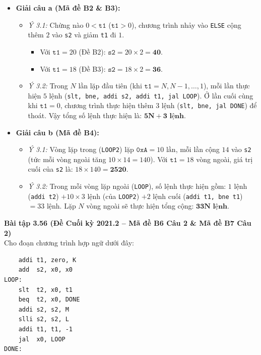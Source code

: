 \begin{itemize}
    \item \textbf{Giải câu a (Mã đề B2 \& B3):}
    \begin{itemize}
        \item \textit{Ý 3.1:} Chừng nào $0 < \texttt{t1}$ ($\texttt{t1} > 0$), chương trình nhảy vào \texttt{ELSE} cộng thêm $2$ vào \texttt{s2} và giảm \texttt{t1} đi $1$.
        \begin{itemize}
            \item Với $\texttt{t1} = 20$ (Đề B2): $\texttt{s2} = 20 \times 2 = \mathbf{40}$.
            \item Với $\texttt{t1} = 18$ (Đề B3): $\texttt{s2} = 18 \times 2 = \mathbf{36}$.
        \end{itemize}
        \item \textit{Ý 3.2:} Trong $N$ lần lặp đầu tiên (khi $\texttt{t1} = N, N-1, \dots, 1$), mỗi lần thực hiện $5$ lệnh (\texttt{slt, bne, addi s2, addi t1, jal LOOP}). Ở lần cuối cùng khi $\texttt{t1} = 0$, chương trình thực hiện thêm $3$ lệnh (\texttt{slt, bne, jal DONE}) để thoát. Vậy tổng số lệnh thực hiện là: $\mathbf{5N + 3\text{ lệnh}}$.
    \end{itemize}
    \item \textbf{Giải câu b (Mã đề B4):}
    \begin{itemize}
        \item \textit{Ý 3.1:} Vòng lặp trong (\texttt{LOOP2}) lặp $\texttt{0xA} = 10\text{ lần}$, mỗi lần cộng $14$ vào \texttt{s2} (tức mỗi vòng ngoài tăng $10 \times 14 = 140$). Với $\texttt{t1} = 18$ vòng ngoài, giá trị cuối của \texttt{s2} là: $18 \times 140 = \mathbf{2520}$.
        \item \textit{Ý 3.2:} Trong mỗi vòng lặp ngoài (\texttt{LOOP}), số lệnh thực hiện gồm: $1$ lệnh (\texttt{addi t2}) $+ 10 \times 3\text{ lệnh}$ (của \texttt{LOOP2}) $+ 2\text{ lệnh}$ cuối (\texttt{addi t1, bne t1}) $= 33\text{ lệnh}$. Lặp $N$ vòng ngoài sẽ thực hiện tổng cộng: $\mathbf{33N\text{ lệnh}}$.
    \end{itemize}
\end{itemize}

\textbf{Bài tập 3.56 (Đề Cuối kỳ 2021.2 -- Mã đề B6 Câu 2 \& Mã đề B7 Câu 2)}\\
Cho đoạn chương trình hợp ngữ dưới đây:

\noindent\begin{minipage}{\linewidth}
\begin{lstlisting}
    addi t1, zero, K
    add  s2, x0, x0
LOOP:
    slt  t2, x0, t1
    beq  t2, x0, DONE
    addi s2, s2, M
    slli s2, s2, L
    addi t1, t1, -1
    jal  x0, LOOP
DONE:
\end{lstlisting}
\end{minipage}

